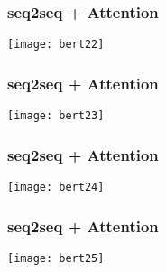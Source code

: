 \begin{frame}[fragile]\frametitle{seq2seq + Attention}





\begin{center}
\texttt{[image: bert22]}
\end{center}	

\end{frame}

\begin{frame}[fragile]\frametitle{seq2seq + Attention}





\begin{center}
\texttt{[image: bert23]}
\end{center}	

\end{frame}

\begin{frame}[fragile]\frametitle{seq2seq + Attention}





\begin{center}
\texttt{[image: bert24]}
\end{center}	

\end{frame}

\begin{frame}[fragile]\frametitle{seq2seq + Attention}

\begin{center}
\texttt{[image: bert25]}
\end{center}	

\end{frame}

